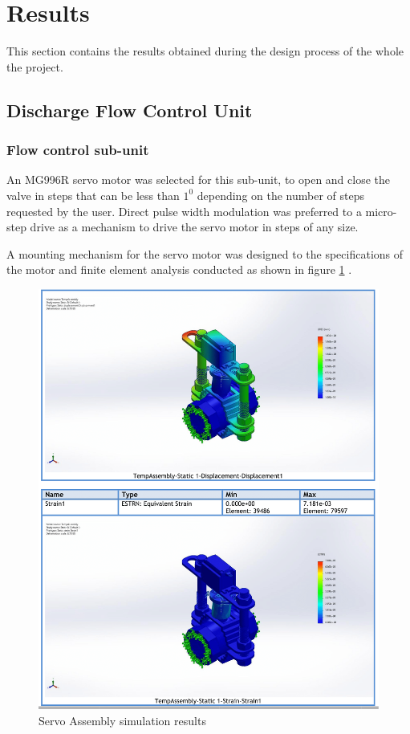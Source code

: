\section{Results}
This section contains the results obtained during the design process of the whole the project.
\subsection{Discharge Flow Control Unit}
\subsubsection{Flow control sub-unit}
An MG996R servo motor was selected for this sub-unit, to open and close the valve in steps that can be less than $1^{0}$ depending on the number of steps requested by the user. Direct pulse width modulation was preferred to a micro-step drive as a mechanism to drive the servo motor in steps of any size.
\par
A mounting mechanism for the servo motor was designed to the specifications of the motor and finite element analysis conducted as shown in figure \ref{fig:servo_assembly_results} .   
\begin{figure}[H]
      \centering
         \includegraphics[width=\textwidth]{Figures/ServoHolderBallValveAssembly-Static-1-1-1.png}
          \caption{Servo Assembly simulation results}
          \label{fig:servo_assembly_results}
      \end{figure}
